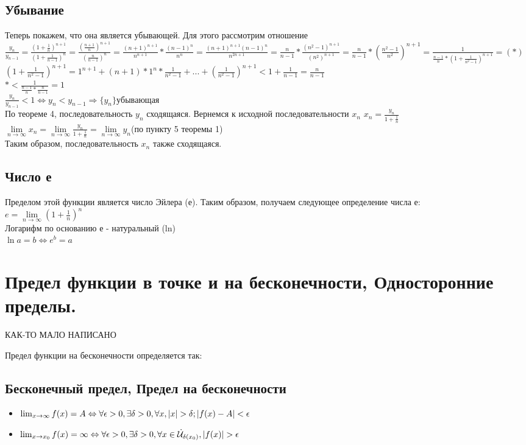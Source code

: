 \documentclass[oneside]{book}
\begin{document}
\begin{enumerate}
\section{Убывание}
Теперь покажем, что она является убывающей. Для этого рассмотрим отношение
$\frac{y_n}{y_{n-1}}=\frac{(1+\frac{1}{n})^{n+1}}{(1+\frac{1}{n-1})^n}=\frac{(\frac{n+1}{n})^{n+1}}{(\frac{n}{n-1})^n}=\frac{(n+1)^{n+1}}{n^{n+1}}*\frac{(n-1)^n}{n^n}=\frac{(n+1)^{n+1}(n-1)^{n}}{n^{2n+1}}=\frac{n}{n-1}*\frac{(n^2-1)^{n+1}}{(n^2)^{n+1}}=\frac{n}{n-1}*(\frac{n^2-1}{n^2})^{n+1}=\frac{1}{\frac{n-1}{n}*(1+\frac{1}{n^2-1})^{n+1}}=(*)$\\
$(1+\frac{1}{n^2-1})^{n+1}=1^{n+1}+(n+1)*1^n*\frac{1}{n^2-1}+...+(\frac{1}{n^2-1})^{n+1}<1+\frac{1}{n-1}=\frac{n}{n-1}$\\
$*<\frac{1}{\frac{n-1}{n}*\frac{n}{n-1}}=1$
\\$\frac{y_n}{y_{n-1}}<1\Leftrightarrow y_n<y_{n-1} \Rightarrow \{y_n\} убывающая$
\\По теореме 4, последовательность $y_n$ сходящаяся. Вернемся к исходной последовательности $x_n$
$x_n=\frac{y_n}{1+\frac{1}{n}}$\\
$\lim \limits_{n\rightarrow \infty}x_n=\lim \limits_{n\rightarrow \infty}\frac{y_n}{1+\frac{1}{n}}=\lim \limits_{n\rightarrow \infty}y_n$(по пункту 5 теоремы 1)\\
Таким образом, последовательность $x_n$ также сходящаяся.
\section{Число е}
Пределом этой функции является число Эйлера (е).
Таким образом, получаем следующее определение числа е:\\
$e=\lim \limits_{n\rightarrow \infty}(1+\frac{1}{n})^n$
\\Логарифм по основанию е - натуральный (ln)\\
$\ln a = b \Leftrightarrow e^b=a$

\setcounter{chapter}{8}
\chapter{Предел функции в точке и на бесконечности, Односторонние пределы.}

{\LARGE КАК-ТО МАЛО НАПИСАНО}

Предел функции на бесконечности определяется так:
\section{Бесконечный предел, Предел на бесконечности}
\begin{itemize}
	\item $\lim_{x \rightarrow \infty}{f(x)} = A \Leftrightarrow \\ \forall \epsilon > 0, \exists \delta > 0,
	\forall x, |x| > \delta; |f(x) - A| < \epsilon$
	\item $\lim_{x \rightarrow x_0}{f(x)} = \infty \Leftrightarrow \\ \forall \epsilon > 0, \exists \delta > 0,
	\forall x \in \dot{\mathcal{U}}_{\delta(x_0)}, |f(x)| > \epsilon$
\end{itemize}


\end{enumerate}
\end{document}
